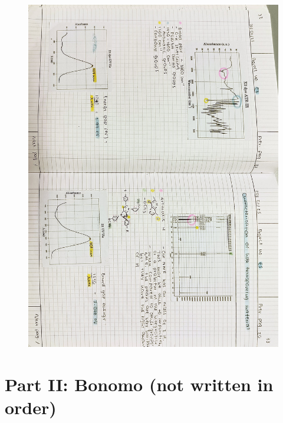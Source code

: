 \begin{figure}[H]
	\centering
	\includegraphics[width=0.6\linewidth, angle=90]{../images/compressed/IMG20250123173048.jpg}
\end{figure}


\section{Part II: Bonomo (not written in order)}


